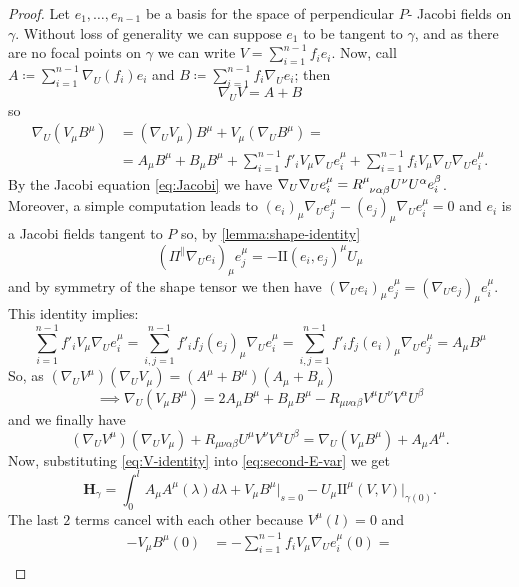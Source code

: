 \begin{proof}
	Let \(e_1, \ldots, e_{n - 1}\) be a basis for the space of perpendicular \(P\)- Jacobi fields on \(\gamma\). Without loss of generality we can suppose \(e_1\) to be tangent to \(\gamma\), and as there are no focal points on \(\gamma\) we can write \(V = \sum_{i = 1}^{n - 1} f_ie_i\).
	Now, call \(A \coloneqq \sum_{i = 1}^{n - 1} \nabla_U(f_i)e_i\) and \(B \coloneqq \sum_{i = 1}^{n - 1} f_i\nabla_Ue_i\); then
	\[
	\nabla_UV = A + B
	\]
	so
	\begin{align*}
		\nabla_U(V_{\mu}B^{\mu}) &= (\nabla_UV_{\mu})B^{\mu} + V_{\mu}(\nabla_UB^{\mu}) = \\
		 &= A_{\mu}B^{\mu} + B_{\mu}B^{\mu} + \sum_{i = 1}^{n - 1}f'_iV_{\mu}\nabla_Ue_i^{\mu} + \sum_{i = 1}^{n - 1}f_iV_{\mu}\nabla_U\nabla_Ue_i^{\mu}.
	\end{align*}
	By the Jacobi equation \eqref{eq:Jacobi} we have \(\nabla_U\nabla_Ue_i^{\mu} = R\indices{^{\mu}_{\nu\alpha\beta}}U^{\nu}U^{\alpha}e_i^{\beta}\). Moreover, a simple computation leads to \((e_i)_{\mu}\nabla_Ue_j^{\mu} - (e_j)_{\mu}\nabla_Ue_i^{\mu} = 0\) and \(e_i\) is  a Jacobi fields tangent to \(P\) so, by \ref{lemma:shape-identity}
	\[
	(\Pi^{\parallel}\nabla_Ue_i)_{\mu}e_j^{\mu} = - \mathrm{I\!I}(e_i, e_j)^{\mu}U_{\mu}
	\]
	and by symmetry of the shape tensor we then have \((\nabla_Ue_i)_{\mu}e_j^{\mu} = (\nabla_Ue_j)_{\mu}e_i^{\mu}\). This identity implies:
	\[
	\sum_{i = 1}^{n - 1}f'_iV_{\mu}\nabla_Ue_i^{\mu} = \sum_{i, j = 1}^{n - 1}f'_if_j(e_j)_{\mu}\nabla_Ue_i^{\mu} = \sum_{i, j = 1}^{n - 1}f'_if_j(e_i)_{\mu}\nabla_Ue_j^{\mu} = A_{\mu}B^{\mu}
	\]
	So, as \((\nabla_UV^{\mu})(\nabla_UV_{\mu}) = (A^{\mu} + B^{\mu}) (A_{\mu} + B_{\mu})\)
	\[
	\implies \nabla_U(V_{\mu}B^{\mu}) = 2A_{\mu}B^{\mu} + B_{\mu}B^{\mu} - R_{\mu\nu\alpha\beta}V^{\mu}U^{\nu}V^{\alpha}U^{\beta}
	\]
	and we finally have
	\begin{equation}
	\label{eq:V-identity}
		(\nabla_UV^{\mu})(\nabla_UV_{\mu}) + R_{\mu\nu\alpha\beta}U^{\mu}V^{\nu}V^{\alpha}U^{\beta} =  \nabla_U(V_{\mu}B^{\mu})  + A_{\mu}A^{\mu}.
	\end{equation}
	Now, substituting \eqref{eq:V-identity} into \eqref{eq:second-E-var} we get
	\[
	\textbf{H}_{\gamma} = \int_{0}^{l} A_{\mu}A^{\mu}(\lambda) d\lambda + V_{\mu}B^{\mu}\Big\vert_{s = 0} - U_{\mu}\mathrm{I\!I}^{\mu}(V, V)\vert_{\gamma(0)}.
	\]
	The last \(2\) terms cancel with each other because \(V^{\mu}(l) = 0\) and 
	\begin{align*}
		-V_{\mu}B^{\mu}(0) &= - \sum_{i = 1}^{n - 1}f_i V_{\mu}\nabla_Ue_i^{\mu}(0) =\\

\end{align*}
\end{proof}
